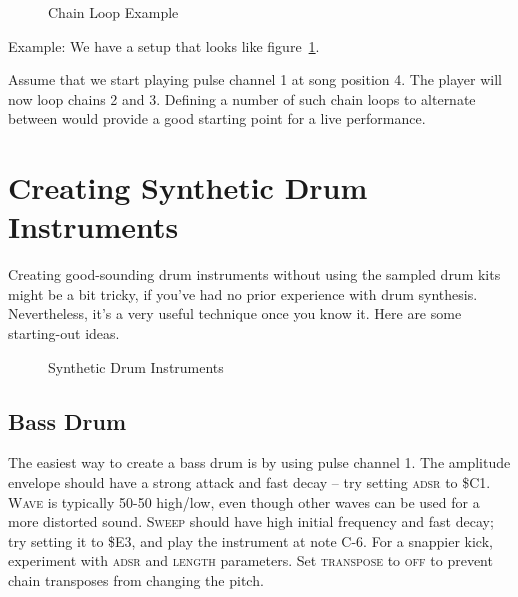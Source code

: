 \begin{figure}[htpb]
	\begin{center}
	\end{center}
	\caption{Chain Loop Example}
	\label{fig:chainloop}
\end{figure}

Example: We have a setup that looks like figure~\ref{fig:chainloop}.

Assume that we start playing pulse channel 1 at song position 4. The player will now loop chains 2 and 3. Defining a number of such chain loops to alternate between would provide a good starting point for a live performance.

\section{Creating Synthetic Drum Instruments}

Creating good-sounding drum instruments without using the sampled drum kits might be a bit tricky, if you've had no prior experience with drum synthesis. Nevertheless, it's a very useful technique once you know it. Here are some starting-out ideas.

\begin{figure}[hbtp]
	\centering
	\qquad

	\qquad

	\qquad

	\caption{Synthetic Drum Instruments}
	\label{fig:instr-examples}
\end{figure}

\subsection{Bass Drum}

The easiest way to create a bass drum is by using pulse channel 1. The amplitude envelope should have a strong attack and fast decay -- try setting \textsc{adsr} to \$C1. \textsc{Wave} is typically 50-50 high/low, even though other waves can be used for a more distorted sound. \textsc{Sweep} should have high initial frequency and fast decay; try setting it to \$E3, and play the instrument at note C-6. For a snappier kick, experiment with \textsc{adsr} and \textsc{length} parameters. Set \textsc{transpose} to \textsc{off} to prevent chain transposes from changing the pitch.


